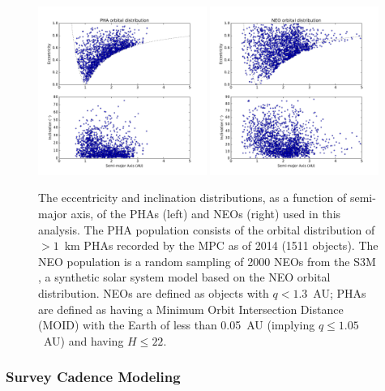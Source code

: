 \begin{figure}[t!]
\centering
\includegraphics[width=0.49\textwidth]{figures/pha20141031_orbits} 
\includegraphics[width=0.49\textwidth]{figures/neos_2k_orbits}
\vskip -0.2in
\caption{The eccentricity and inclination distributions, as a function of semi-major axis, of the PHAs (left) and NEOs (right) used in this analysis. The PHA population consists of the orbital distribution of $>1$~km PHAs recorded by the MPC as of 2014 (1511 objects). The NEO population is a random sampling of 2000 NEOs from the S3M \citep{Grav2011}, a synthetic solar system model based on the \cite{Bottke2002} NEO orbital distribution. NEOs are defined as objects with $q<1.3$~AU; PHAs are defined as having a Minimum Orbit Intersection Distance (MOID) with the Earth of less than 0.05~AU (implying $q\le1.05$~AU) and having $H\le22$.  \label{fig:PHA_orbits}}
\end{figure}

\subsubsection{Survey Cadence Modeling} 


